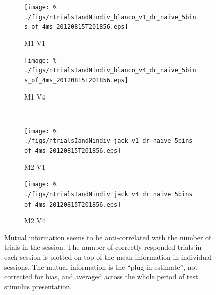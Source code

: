 %
%
% 
% 
\begin{figure}[htbp]
    \begin{subfigure}[b]{0.5\linewidth}
        \centering
        \caption{\small{}M1 V1}
        \label{fig:IandNb1}
        \texttt{[image: \%
./figs/ntrialsIandNindiv\_blanco\_v1\_dr\_naive\_5bins\_of\_4ms\_20120815T201856.eps]}
    \end{subfigure}
    \begin{subfigure}[b]{0.5\linewidth}
        \centering
        \caption{\small{}M1 V4}
        \label{fig:IandNb4}
        \texttt{[image: \%
./figs/ntrialsIandNindiv\_blanco\_v4\_dr\_naive\_5bins\_of\_4ms\_20120815T201856.eps]}
    \end{subfigure}
    \\
    \begin{subfigure}[b]{0.5\linewidth}
        \centering
        \caption{\small{}M2 V1}
        \label{fig:IandNj1}
        \texttt{[image: \%
./figs/ntrialsIandNindiv\_jack\_v1\_dr\_naive\_5bins\_of\_4ms\_20120815T201856.eps]}
    \end{subfigure}
    \begin{subfigure}[b]{0.5\linewidth}
        \centering
        \caption{\small{}M2 V4}
        \label{fig:IandNj4}
        \texttt{[image: \%
./figs/ntrialsIandNindiv\_jack\_v4\_dr\_naive\_5bins\_of\_4ms\_20120815T201856.eps]}
    \end{subfigure}
    \caption{\small{}Mutual information seems to be anti-correlated with the number of trials in the session. The number of correctly responded trials in each session is plotted on top of the mean information in individual sessions. The mutual information is the ``plug-in estimate'', not corrected for bias, and averaged across the whole period of test stimulus presentation.
}
    \label{fig:IandN}
\end{figure}

